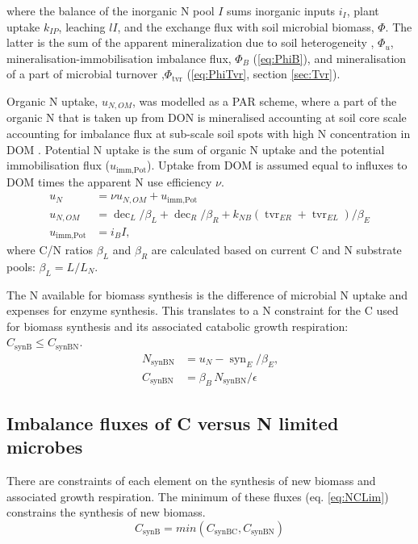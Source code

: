 \noindent where the balance of the inorganic N pool $I$ sums inorganic
inputs $i_I$, plant uptake $k_{IP}$, leaching $l I$, and the exchange flux with
soil microbial biomass, $\Phi$. The latter is the sum of the
apparent mineralization
due to soil heterogeneity \citep{Manzoni08}, $\Phi_u$, mineralisation-immobilisation
imbalance flux, $\Phi_B$ (\ref{eq:PhiB}), and mineralisation of a part of microbial
turnover ,$\Phi_{\operatorname{tvr}}$ (\ref{eq:PhiTvr}, section \ref{sec:Tvr}).

Organic N uptake, $u_{N,OM}$, was modelled as a PAR scheme,
where a part of the organic N that is taken up from DON is mineralised
accounting at soil core scale accounting for imbalance flux at sub-scale soil
spots with high N concentration in DOM \citep{Manzoni08}.
Potential N uptake is the sum of organic N uptake and the potential
immobilisation flux ($u_{\operatorname{imm,Pot}}$). Uptake from DOM is assumed
equal to influxes to DOM times the apparent N use efficiency $\nu$.
\begin{subequations}
\label{eq:uN}
\begin{align}
u_N &= \nu u_{N,OM} + u_{\operatorname{imm,Pot}}
\\
u_{N,OM} &= \operatorname{dec}_L/\beta_L + \operatorname{dec}_R/\beta_R +
k_{NB} (\operatorname{tvr}_{ER} + \operatorname{tvr}_{EL})/\beta_E
\\
u_{\operatorname{imm,Pot}} &= i_B I 
\text{,}
\end{align}
\end{subequations}
where C/N ratios $\beta_L$ and $\beta_R$ are calculated based on current C
and N substrate pools: $\beta_L = L/L_N$.  

The N available for biomass synthesis is the difference of microbial N
uptake and expenses for enzyme synthesis. This translates to a N
constraint for the C used for biomass synthesis and its associated
catabolic growth respiration: $C_{\operatorname{synB}} \le
C_{\operatorname{synBN}}$.
\begin{subequations}
\label{eq:synBN}
\begin{align}
N_{\operatorname{synBN}} &= u_N - \operatorname{syn}_E/\beta_E \text{,} \\
C_{\operatorname{synBN}} &= \beta_B \, N_{\operatorname{synBN}}  / \epsilon
\end{align}
\end{subequations}


\subsection{Imbalance fluxes of C versus N limited microbes }
There are constraints of each element on the synthesis of new
biomass and associated growth respiration. The minimum of these fluxes (eq.
\ref{eq:NCLim}) constrains the synthesis of new biomass. 
\begin{equation}
\label{eq:NCLim} 
C_{\operatorname{synB}} =
min(C_{\operatorname{synBC}}, C_{\operatorname{synBN}} )
\end{equation}

